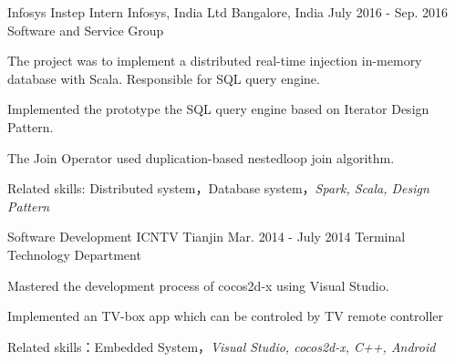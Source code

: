 \begin{cventries}
  \cventry
    {Infosys Instep Intern}
    {Infosys, India Ltd}
    {Bangalore, India}
    {July 2016 - Sep. 2016}
    {Software and Service Group}
    {
      \begin{cvitems}
        \item {The project was to implement a distributed real-time injection in-memory database with Scala. Responsible for SQL query engine.}
        \item {Implemented the prototype the SQL query engine based on Iterator Design Pattern.}
        \item {The Join Operator used duplication-based nestedloop join algorithm.}
        \item {Related skills: Distributed system，Database system，\it{Spark, Scala, Design Pattern}}
      \end{cvitems}
    }
  \cventry
    {Software Development}
    {ICNTV}
    {Tianjin}
    {Mar. 2014 - July 2014}
    {Terminal Technology Department}
    {
      \begin{cvitems}
        \item {Mastered the development process of cocos2d-x using Visual Studio.}
        \item {Implemented an TV-box app which can be controled by TV remote controller}
        \item {Related skills：Embedded System，\it{Visual Studio, cocos2d-x, C++, Android}}
      \end{cvitems} 
    }
\end{cventries}
